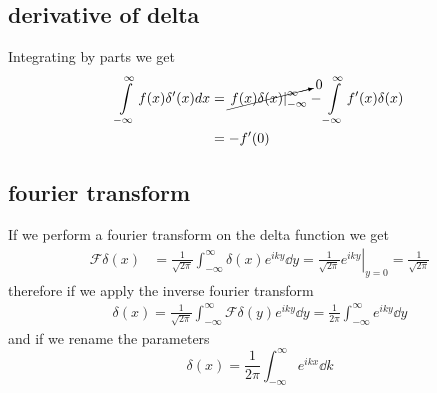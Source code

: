 \subsection{derivative of delta}
Integrating by parts we get
\begin{align*}
    \int\limits_{-\infty}^\infty f(x)\delta'(x)dx &= \cancelto{0}{\left.f(x)\delta(x)\right|_{-\infty}^\infty}-\int\limits_{-\infty}^\infty f'(x)\delta(x)\\
    &= -f'(0)
\end{align*}
\subsection{fourier transform}
If we perform a fourier transform on the delta function we get
\begin{align}
	\mathcal{F}\delta(x) &= \frac{1}{\sqrt{2\pi}}\int_{-\infty}^{\infty}\delta(x)e^{iky}\dd y = \left.\frac{1}{\sqrt{2\pi}}e^{iky}\right\vert_{y=0}=\frac{1}{\sqrt{2\pi}}
\end{align}
therefore if we apply the inverse fourier transform
\begin{align}
	\delta(x) = \frac{1}{\sqrt{2\pi}}\int_{-\infty}^{\infty}\mathcal{F}\delta(y)e^{iky} \dd y = \frac{1}{2\pi}\int_{-\infty}^{\infty}e^{iky} \dd y
\end{align}
and if we rename the parameters
\begin{equation}
	\delta(x)= \frac{1}{2\pi}\int_{-\infty}^{\infty}e^{ikx} \dd k
\end{equation}